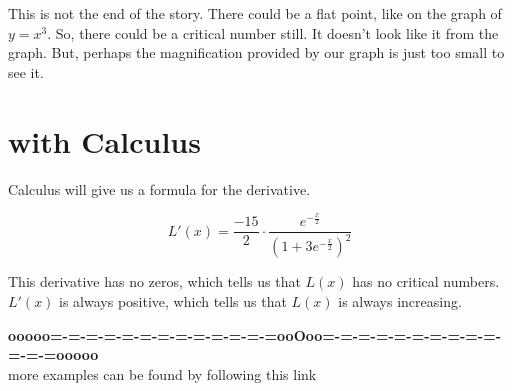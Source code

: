 \documentclass{ximera}
\begin{document}
This is not the end of the story. There could be a flat point, like on the graph of $y = x^3$. So, there could be a critical number still.  It doesn't look like it from the graph. But, perhaps the magnification provided by our graph is just too small to see it.



\section{with Calculus}


Calculus will give us a formula for the derivative.

\[  L'(x) =   \frac{-15}{2} \cdot \frac{e^{-\tfrac{x}{2}}}{\left(1+3 e^{-\tfrac{x}{2}}\right)^2}    \]


This derivative has no zeros, which tells us that $L(x)$ has no critical numbers.  $L'(x)$ is always positive, which tells us that $L(x)$ is always increasing.











\begin{center}
\textbf{\textcolor{green!50!black}{ooooo=-=-=-=-=-=-=-=-=-=-=-=-=ooOoo=-=-=-=-=-=-=-=-=-=-=-=-=ooooo}} \\

more examples can be found by following this link\\ 

\end{center}
\end{document}
